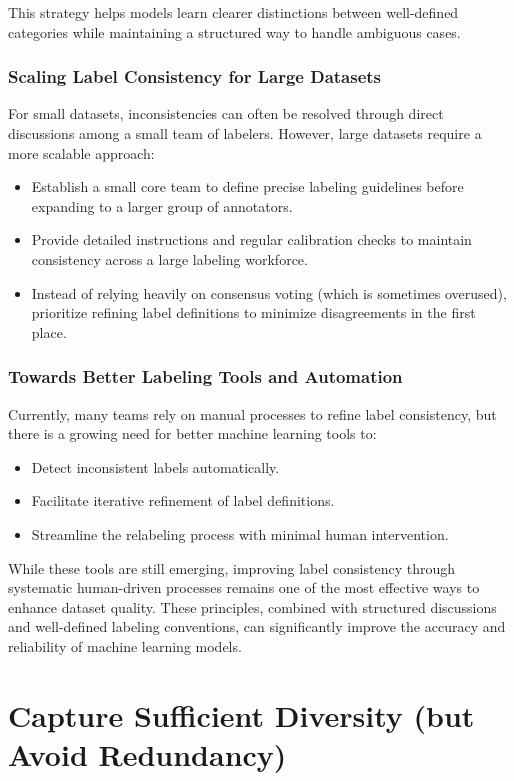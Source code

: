 \documentclass[12pt,openany]{book}
\begin{document}
This strategy helps models learn clearer distinctions between well-defined categories while maintaining a structured way to handle ambiguous cases.

\subsubsection{Scaling Label Consistency for Large Datasets}
For small datasets, inconsistencies can often be resolved through direct discussions among a small team of labelers. However, large datasets require a more scalable approach:
\begin{itemize}
    \item Establish a small core team to define precise labeling guidelines before expanding to a larger group of annotators.
    \item Provide detailed instructions and regular calibration checks to maintain consistency across a large labeling workforce.
    \item Instead of relying heavily on consensus voting (which is sometimes overused), prioritize refining label definitions to minimize disagreements in the first place.
\end{itemize}

\subsubsection{Towards Better Labeling Tools and Automation}
Currently, many teams rely on manual processes to refine label consistency, but there is a growing need for better machine learning tools to:
\begin{itemize}
    \item Detect inconsistent labels automatically.
    \item Facilitate iterative refinement of label definitions.
    \item Streamline the relabeling process with minimal human intervention.
\end{itemize}

While these tools are still emerging, improving label consistency through systematic human-driven processes remains one of the most effective ways to enhance dataset quality. These principles, combined with structured discussions and well-defined labeling conventions, can significantly improve the accuracy and reliability of machine learning models.



\section{Capture Sufficient Diversity (but Avoid Redundancy)}
\end{document}
